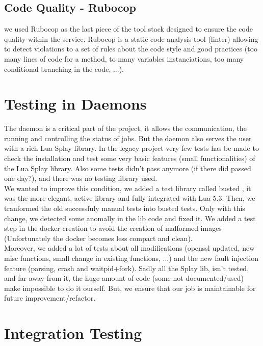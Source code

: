 \documentclass{eplmastersthesis}
\begin{document}
      \subsection{Code Quality - Rubocop}

        we used Rubocop as the last piece of the tool stack designed to ensure
        the code quality within the service. Rubocop is a static code analysis
        tool (linter) allowing to detect violations to a set of rules about
        the code style and good practices (too many lines of code for a method,
        to many variables instanciations, too many conditional branching
        in the code, ...).

    \section{Testing in Daemons}

      The daemon is a critical part of the project, it allows the communication, the running
      and controlling the status of jobs. But the daemon also serves the user with a rich Lua Splay library.
      In the legacy project very few tests has be made to check the installation and
      test some very basic features (small functionalities) of the Lua Splay library. Also some tests didn't pass anymore
      (if there did passed one day?), and there was no testing library used. \\

      We wanted to improve this condition, we added a test library called busted \cite{busted}, it was the more elegant,
      active library and fully integrated with Lua 5.3. Then, we tranformed the old successfuly manual tests into busted tests.
      Only with this change, we detected some anomally in the lib code and fixed it. We added a test step in the
      docker creation to avoid the creation of malformed images (Unfortunately the docker becomes less compact and clean). \\

      Moreover, we added a lot of tests about all modifications (openssl updated, new misc functions, small change in existing functions, ...)
      and the new fault injection feature (parsing, crash and waitpid+fork). Sadly all the Splay lib, isn't tested, and far away from it,
      the huge amount of code (some not documented/used) make impossible to do it ourself. But, we ensure that our job is
      maintainable for future improvement/refactor.

    \section{Integration Testing}
\end{document}
